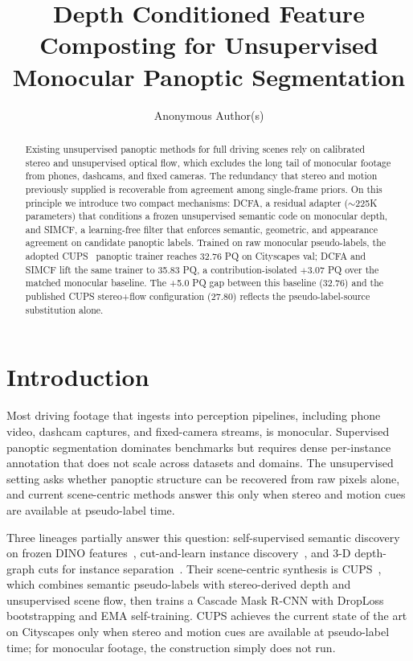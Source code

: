 \documentclass{article}
\title{Depth Conditioned Feature Composting for Unsupervised Monocular Panoptic Segmentation}
\author{Anonymous Author(s)}
\begin{document}
\raggedbottom

\maketitle

\begin{abstract}
Existing unsupervised panoptic methods for full driving scenes rely on calibrated stereo and unsupervised optical flow, which excludes the long tail of monocular footage from phones, dashcams, and fixed cameras. The redundancy that stereo and motion previously supplied is recoverable from agreement among single-frame priors. On this principle we introduce two compact mechanisms: DCFA, a residual adapter ($\sim$225K parameters) that conditions a frozen unsupervised semantic code on monocular depth, and SIMCF, a learning-free filter that enforces semantic, geometric, and appearance agreement on candidate panoptic labels. Trained on raw monocular pseudo-labels, the adopted CUPS~\cite{hahn2025cups} panoptic trainer reaches 32.76 PQ on Cityscapes val; DCFA and SIMCF lift the same trainer to 35.83 PQ, a contribution-isolated $+$3.07 PQ over the matched monocular baseline. The +5.0 PQ gap between this baseline (32.76) and the published CUPS stereo+flow configuration (27.80) reflects the pseudo-label-source substitution alone.
\end{abstract}

\section{Introduction}
\label{sec:intro}

Most driving footage that ingests into perception pipelines, including phone video, dashcam captures, and fixed-camera streams, is monocular. Supervised panoptic segmentation dominates benchmarks but requires dense per-instance annotation that does not scale across datasets and domains. The unsupervised setting asks whether panoptic structure can be recovered from raw pixels alone, and current scene-centric methods answer this only when stereo and motion cues are available at pseudo-label time.

Three lineages partially answer this question: self-supervised semantic discovery on frozen DINO features~\cite{oquab2024dinov2,kim2024cause}, cut-and-learn instance discovery~\cite{wang2023cutler}, and 3-D depth-graph cuts for instance separation~\cite{sick2025cuts3d}. Their scene-centric synthesis is CUPS~\cite{hahn2025cups}, which combines semantic pseudo-labels with stereo-derived depth and unsupervised scene flow, then trains a Cascade Mask R-CNN with DropLoss bootstrapping and EMA self-training. CUPS achieves the current state of the art on Cityscapes only when stereo and motion cues are available at pseudo-label time; for monocular footage, the construction simply does not run.
\end{document}
